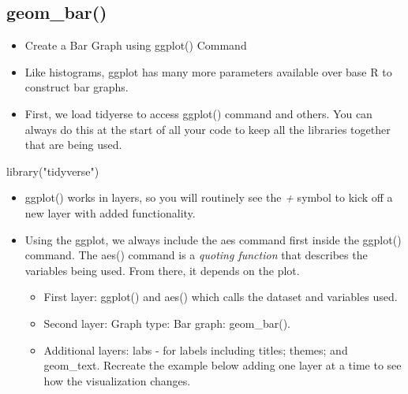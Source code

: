 \documentclass[
  letterpaper,
  DIV=11,
  numbers=noendperiod]{scrreprt}
\newenvironment{Shaded}{\begin{snugshade}}{\end{snugshade}}
\newcommand{\FunctionTok}[1]{\textcolor[rgb]{0.28,0.35,0.67}{#1}}
\newcommand{\NormalTok}[1]{\textcolor[rgb]{0.00,0.23,0.31}{#1}}
\newcommand{\StringTok}[1]{\textcolor[rgb]{0.13,0.47,0.30}{#1}}
\providecommand{\tightlist}{%
  \setlength{\itemsep}{0pt}\setlength{\parskip}{0pt}}\usepackage{longtable,booktabs,array}
\begin{document}
\subsection{geom\_bar()}\label{geom_bar}

\begin{itemize}
\tightlist
\item
  Create a Bar Graph using ggplot() Command
\item
  Like histograms, ggplot has many more parameters available over base R
  to construct bar graphs.
\item
  First, we load tidyerse to access ggplot() command and others. You can
  always do this at the start of all your code to keep all the libraries
  together that are being used.
\end{itemize}

\begin{Shaded}
\begin{Highlighting}[]
\FunctionTok{library}\NormalTok{(}\StringTok{"tidyverse"}\NormalTok{)}
\end{Highlighting}
\end{Shaded}

\begin{itemize}
\tightlist
\item
  ggplot() works in layers, so you will routinely see the \emph{+}
  symbol to kick off a new layer with added functionality.
\item
  Using the ggplot, we always include the aes command first inside the
  ggplot() command. The aes() command is a \emph{quoting function} that
  describes the variables being used. From there, it depends on the
  plot.

  \begin{itemize}
  \tightlist
  \item
    First layer: ggplot() and aes() which calls the dataset and
    variables used.
  \item
    Second layer: Graph type: Bar graph: geom\_bar().
  \item
    Additional layers: labs - for labels including titles; themes; and
    geom\_text. Recreate the example below adding one layer at a time to
    see how the visualization changes.
  \end{itemize}
\end{itemize}
\end{document}
